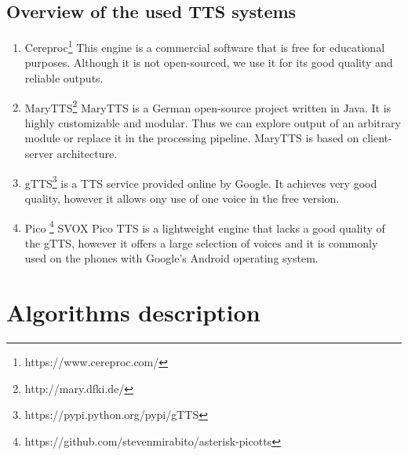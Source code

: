 \subsection*{Overview of the used TTS systems}
\begin{enumerate}
\item Cereproc\footnote{https://www.cereproc.com/}
This engine is a commercial software that is free for educational purposes.
Although it is not open-sourced, we use it for its good quality and reliable outputs.
\item MaryTTS\footnote{http://mary.dfki.de/} MaryTTS is a German open-source project written in Java.
It is highly customizable and modular.
Thus we can explore output of an arbitrary module or replace it in the processing pipeline.
MaryTTS is based on client-server architecture.
\item gTTS\footnote{https://pypi.python.org/pypi/gTTS} is a TTS service provided online by Google.
It achieves very good quality, however it allows ony use of one voice in the free version.
\item Pico \footnote{https://github.com/stevenmirabito/asterisk-picotts} SVOX Pico TTS is a lightweight engine that lacks a good quality of the gTTS, however it offers a large selection of voices and it is commonly used on the phones with Google's Android operating system.

\end{enumerate}
\section{Algorithms description}
